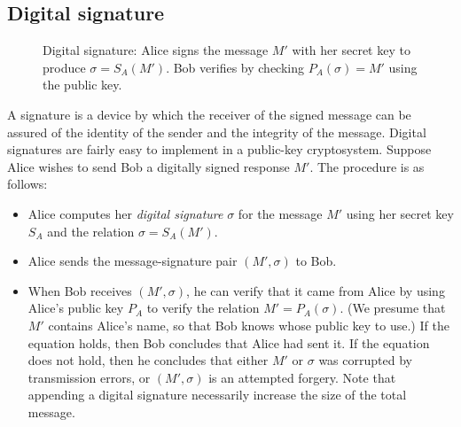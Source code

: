 \subsection{Digital signature}

\begin{figure}[h]
\centering
{}
\caption{Digital signature: Alice signs the message $M'$ with her secret key to produce $\sigma=S_A(M')$. Bob verifies by checking $P_A(\sigma)=M'$ using the public key.}
\end{figure}

A signature is a device by which the receiver of the signed message can be assured of the identity of the sender and the integrity of the message. Digital signatures are fairly easy to implement in a public-key cryptosystem. Suppose Alice wishes to send Bob a digitally signed response $M'$. The procedure is as follows:

\begin{itemize}
\item Alice computes her \textit{digital signature} $\sigma$ for the message $M'$ using her secret key $S_A$ and the relation $\sigma = S_A(M')$.
\item Alice sends the message-signature pair $(M', \sigma)$ to Bob.
\item When Bob receives $(M', \sigma)$, he can verify that it came from Alice by using Alice's public key $P_A$ to verify the relation $M' = P_A(\sigma)$. (We presume that $M'$ contains Alice's name, so that Bob knows whose public key to use.) If the equation holds, then Bob concludes that Alice had sent it. If the equation does not hold, then he concludes that either $M'$ or $\sigma$ was corrupted by transmission errors, or $(M', \sigma)$ is an attempted forgery. Note that appending a digital signature necessarily increase the size of the total message.

\end{itemize}     

